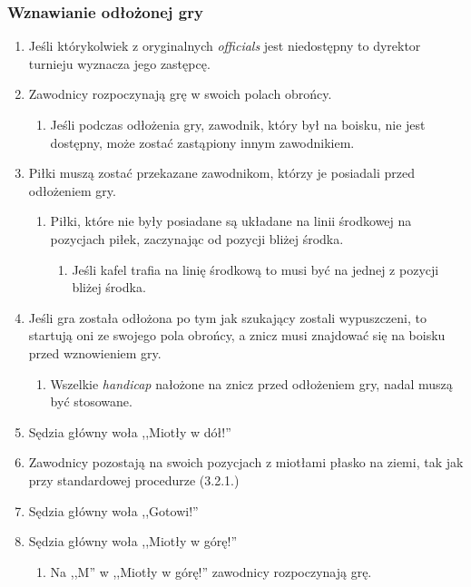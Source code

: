 \documentclass[11pt,a4paper]{article}
\begin{document}
\subsubsection{Wznawianie odłożonej gry}
\begin{enumerate}
  \item Jeśli którykolwiek z oryginalnych \emph{officials} jest niedostępny to dyrektor turnieju wyznacza jego zastępcę.
  \item Zawodnicy rozpoczynają grę w swoich polach obrońcy.
  \begin{enumerate}
    \item Jeśli podczas odłożenia gry, zawodnik, który był na boisku, nie jest dostępny, może zostać zastąpiony innym zawodnikiem.
  \end{enumerate}
  \item Piłki muszą zostać przekazane zawodnikom, którzy je posiadali przed odłożeniem gry.
  \begin{enumerate}
    \item Piłki, które nie były posiadane są układane na linii środkowej na pozycjach piłek, zaczynając od pozycji bliżej środka.
    \begin{enumerate}
      \item Jeśli kafel trafia na linię środkową to musi być na jednej z pozycji bliżej środka.
    \end{enumerate}
  \end{enumerate}
  \item Jeśli gra została odłożona po tym jak szukający zostali wypuszczeni, to startują oni ze swojego pola obrońcy, a znicz musi znajdować się na boisku przed wznowieniem gry.
  \begin{enumerate}
    \item Wszelkie \emph{handicap} nałożone na znicz przed odłożeniem gry, nadal muszą być stosowane.
  \end{enumerate}
  \item Sędzia główny woła ,,Miotły w dół!''
  \item Zawodnicy pozostają na swoich pozycjach z miotłami płasko na ziemi, tak jak przy standardowej procedurze (3.2.1.) %
  \item Sędzia główny woła ,,Gotowi!''
  \item Sędzia główny woła ,,Miotły w górę!''
  \begin{enumerate}
    \item Na ,,M'' w ,,Miotły w górę!'' zawodnicy rozpoczynają grę.
  \end{enumerate}
\end{enumerate}
\end{document}
